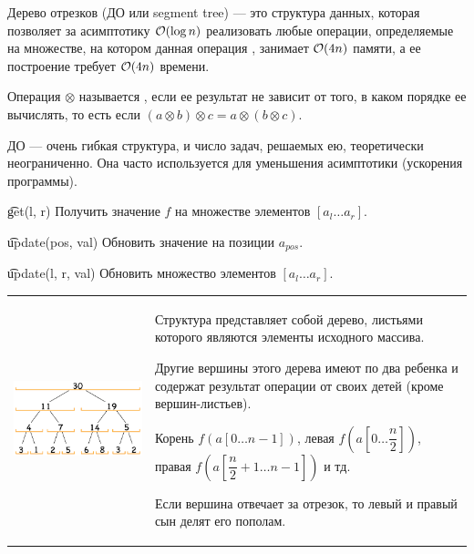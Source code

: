 
Дерево отрезков (ДО или segment tree) --- это структура данных, которая позволяет за асимптотику $\mathcal{O}(\log n)$ реализовать любые операции, определяемые на множестве, на котором данная операция {}, занимает $\mathcal{O}(4n)$ памяти, а ее построение требует $\mathcal{O}(4n)$ времени.

\down
Операция $\otimes$ называется {}, если ее результат не зависит от того, в каком порядке ее вычислять, то есть если $(a \otimes b) \otimes c = a \otimes (b \otimes c)$.

\down
ДО — очень гибкая структура, и число задач, решаемых ею, теоретически неограниченно. Она часто используется для уменьшения асимптотики (ускорения программы).



\t{get(l, r)} Получить значение $f$ на множестве элементов $[a_l \ldots a_r]$.

\t{update(pos, val)} Обновить значение на позиции $a_{pos}$.

\t{update(l, r, val)} Обновить множество элементов $[a_l \ldots a_r]$.



\begin{tabular}{cm{}}
	\begin{minipage}{4cm}
		\includegraphics[scale=0.5]{files/sumdo.png}
	\end{minipage} 
	&
Структура представляет собой дерево, листьями которого являются элементы исходного массива. 

Другие вершины этого дерева имеют по два ребенка и содержат результат операции от своих детей (кроме вершин-листьев).

Корень $f(a[0 \ldots n - 1])$, левая $f(a[0 \ldots \dfrac{n}{2}])$, правая $f(a[\dfrac{n}{2} + 1 \ldots n - 1])$ и тд.

Если вершина отвечает за отрезок, то левый и правый сын делят его пополам.
\end{tabular}


